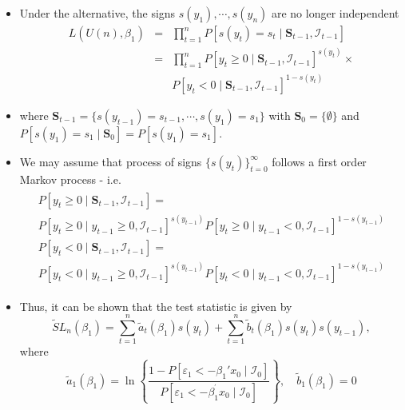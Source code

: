 \documentclass{beamer}
\begin{document}
\begin{frame}
\begin{itemize}
\item{} Under the alternative, the signs $s(y_1),\cdots,s(y_n)$ are no longer independent
\begin{eqnarray*}
L(U(n),\beta_1)&=&\prod\limits_{t=1}^{n}P[s(y_t)=s_t\mid \bm{S}_{t-1},\mathcal{I}_{t-1}]\\
&=&\prod\limits_{t=1}^{n}P[y_t\geq 0\mid \bm{S}_{t-1},\mathcal{I}_{t-1}]^{s(y_t)}\times\\
&&P[y_t< 0\mid \bm{S}_{t-1},\mathcal{I}_{t-1}]^{1-s(y_t)}
\end{eqnarray*}
\item{} where $\bm{S}_{t-1}=\{s(y_{t-1})=s_{t-1},\cdots,s(y_1)=s_1\}$ with $\bm{S}_0=\{\emptyset\}$ and $P[s(y_1)=s_1\mid \bm{S}_0]=P[s(y_1)=s_1]$.
\end{itemize}
\end{frame}

\begin{frame}
\begin{itemize}
\item{} We may assume that process of signs $\{s(y_t)\}_{t=0}^{\infty}$ follows a first order Markov process - i.e.
\begin{align*}
\begin{array}{l}
P[y_t\geq 0\mid \bm{S}_{t-1},\mathcal{I}_{t-1}]=\\
P[y_t\geq0\mid y_{t-1}\geq0,\mathcal{I}_{t-1}]^{s(y_{t-1})}P[y_t\geq0\mid y_{t-1}<0, \mathcal{I}_{t-1}]^{1-s(y_{t-1})}\\
P[y_t< 0\mid \bm{S}_{t-1},\mathcal{I}_{t-1}]=\\
P[y_t<0\mid y_{t-1}\geq0,\mathcal{I}_{t-1}]^{s(y_{t-1})}P[y_t<0\mid y_{t-1}<0,\mathcal{I}_{t-1}]^{1-s(y_{t-1})}
\end{array}
\end{align*}
\item{} Thus, it can be shown that the test statistic is given by
\begin{equation*}
\tilde{S}L_{n}(\beta _{1})=\sum\limits_{t=1}^{n}\tilde{a}_{t}(\beta _{1})%
s(y_{t})+\sum\limits_{t=1}^{n}\tilde{b}_{t}(\beta _{1})%
s(y_{t})s(y_{t-1}),
\end{equation*}%
where%
\begin{equation*}
\tilde{a}_{1}(\beta _{1})=\ln \left\{ \frac{1-P\left[ \varepsilon_{1}<-\beta
_{1}'x_{0}\mid\mathcal{I}_{0}\right] }{P\left[ \varepsilon_{1}<-\beta _{1}^{^{\prime
}}x_{0}\mid\mathcal{I}_{0}\right] }\right\} ,\quad\tilde{b}_{1}(\beta _{1})=0
\end{equation*}%
\end{itemize}
\end{frame}
\end{document}
